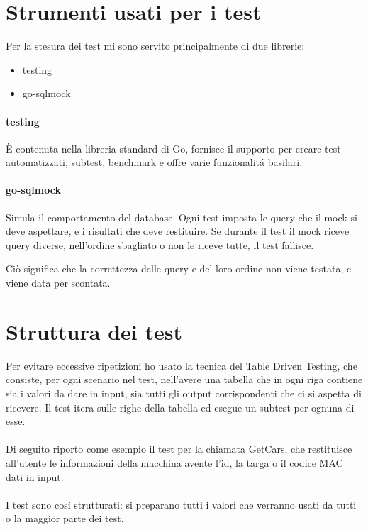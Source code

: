 \documentclass[italian, oneside]{sapthesis} %
\begin{document}
	\section{Strumenti usati per i test}
		Per la stesura dei test mi sono servito principalmente di due librerie:
		\begin{itemize}
			\item testing\cite{ref:testing}
			\item go-sqlmock\cite{ref:sqlmock}
		\end{itemize}
		\paragraph*{testing}
		\`E contenuta nella libreria standard di Go, fornisce il supporto per creare test automatizzati, subtest, benchmark e offre varie funzionalit\'a basilari.
		\paragraph*{go-sqlmock}
		Simula il comportamento del database. Ogni test imposta le query che il mock si deve aspettare, e i risultati che deve restituire. Se durante il test il mock riceve query diverse, nell'ordine sbagliato o non le riceve tutte, il test fallisce.

		Ci\`o significa che la correttezza delle query e del loro ordine non viene testata, e viene data per scontata.

	\section{Struttura dei test}
		Per evitare eccessive ripetizioni ho usato la tecnica del Table Driven Testing, che consiste, per ogni scenario nel test, nell'avere una tabella che in ogni riga contiene sia i valori da dare in input, sia tutti gli output corrispondenti che ci si aspetta di ricevere. Il test itera sulle righe della tabella ed esegue un subtest per ognuna di esse.

		\paragraph*{}
		Di seguito riporto come esempio il test per la chiamata GetCars, che restituisce all'utente le informazioni della macchina avente l'id, la targa o il codice MAC dati in input.

		\paragraph*{}
		I test  sono cos\'i strutturati: si preparano tutti i valori che verranno usati da tutti o la maggior parte dei test.
\end{document}
